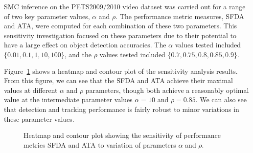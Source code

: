 \documentclass{article}
\begin{document}
SMC inference on the PETS2009/2010 video dataset was carried out for a range of two key parameter values, $\alpha$ and $\rho$. The performance metric measures, SFDA and ATA, were computed for each combination of these two parameters. This sensitivity investigation focused on these parameters due to their potential to have a large effect on object detection accuracies. The $\alpha$ values tested included $\{ 0.01, 0.1, 1, 10, 100 \}$, and the $\rho$ values tested included $\{ 0.7, 0.75, 0.8, 0.85, 0.9 \}$.

Figure~\ref{fig:sens_surf} shows a heatmap and contour plot of the sensitivity analysis results. From this figure, we can see that the SFDA and ATA achieve their maximal values at different $\alpha$ and $\rho$ parameters, though both achieve a reasonably optimal value at the intermediate parameter values $\alpha = 10$ and $\rho = 0.85$. We can also see that detection and tracking performance is fairly robust to minor variations in these parameter values.

\begin{figure}[!]
  \centering             
  \hspace{6mm}
  \caption{Heatmap and contour plot showing the sensitivity of performance metrics SFDA and ATA to variation of parameters $\alpha$ and $\rho$.}
  \label{fig:sens_surf}
\end{figure}
\end{document}
